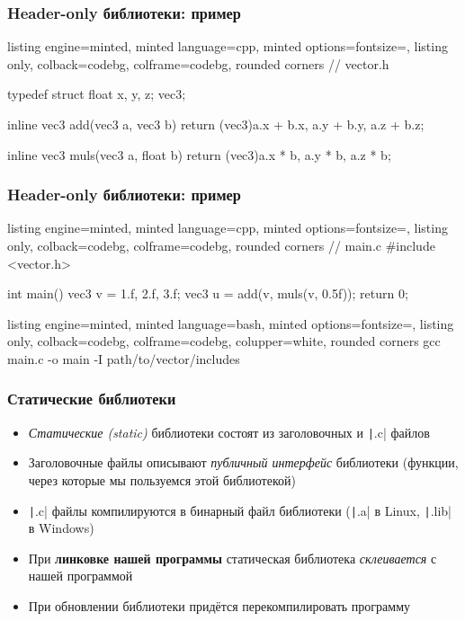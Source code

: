 \documentclass[10pt]{beamer}
\begin{document}
\begin{frame}[fragile]
\frametitle{Header-only библиотеки: пример}
\begin{tcblisting}{listing engine=minted, minted language=cpp, minted options={fontsize=\scriptsize}, listing only, colback=codebg, colframe=codebg, rounded corners}
// vector.h

typedef struct {
  float x, y, z;
} vec3;

inline vec3 add(vec3 a, vec3 b) {
  return (vec3){a.x + b.x, a.y + b.y, a.z + b.z};
}

inline vec3 muls(vec3 a, float b) {
  return (vec3){a.x * b, a.y * b, a.z * b};
}
\end{tcblisting}
\end{frame}

\begin{frame}[fragile]
\frametitle{Header-only библиотеки: пример}
\begin{tcblisting}{listing engine=minted, minted language=cpp, minted options={fontsize=\scriptsize}, listing only, colback=codebg, colframe=codebg, rounded corners}
// main.c
#include <vector.h>

int main() {
  vec3 v = {1.f, 2.f, 3.f};
  vec3 u = add(v, muls(v, 0.5f));
  return 0;
}
\end{tcblisting}
\begin{tcblisting}{listing engine=minted, minted language=bash, minted options={fontsize=\scriptsize}, listing only, colback=codebg, colframe=codebg, colupper=white, rounded corners}
gcc main.c -o main -I path/to/vector/includes
\end{tcblisting}
\end{frame}

\begin{frame}[fragile]
\frametitle{Статические библиотеки}
\begin{itemize}
\item \textit{Статические (static)} библиотеки состоят из заголовочных и \texttt|.c| файлов
\pause
\item Заголовочные файлы описывают \textit{публичный интерфейс} библиотеки (функции, через которые мы пользуемся этой библиотекой)
\pause
\item \texttt|.c| файлы компилируются в бинарный файл библиотеки (\texttt|.a| в Linux, \texttt|.lib| в Windows)
\pause
\item При \textbf{линковке нашей программы} статическая библиотека \textit{склеивается} с нашей программой
\pause
\item При обновлении библиотеки придётся перекомпилировать программу
\end{itemize}
\end{frame}
\end{document}
